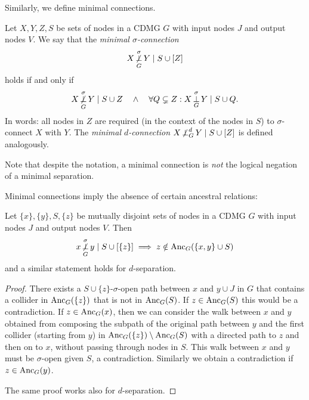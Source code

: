Similarly, we define minimal connections.
\begin{Def}\label{def:min_con}
Let $X,Y,Z,S$ be sets of nodes in a CDMG $G$ with input nodes $J$ and output nodes $V$. 
We say that the \emph{minimal $\sigma$-connection}
  $$X \operatorname*{\not\perp}_G^\sigma Y \mid S \cup [Z]$$
holds if and only if
  $$X \operatorname*{\not\perp}_G^\sigma Y \mid S \cup Z\quad\land\quad \forall Q \subsetneq Z: X \operatorname*{\perp}_G^\sigma Y \mid S \cup Q.$$
In words: all nodes in $Z$ are required (in the context of the nodes in $S$) to $\sigma$-connect $X$ with $Y$.
The \emph{minimal $d$-connection} $X \operatorname*{\not\perp}_G^d Y \mid S \cup [Z]$ is defined analogously.
\end{Def}
Note that despite the notation, a minimal connection is \emph{not} the logical negation of a minimal separation.

Minimal connections imply the absence of certain ancestral relations:
\begin{Prp}\label{prp:min_con}
Let $\{x\},\{y\},S,\{z\}$ be mutually disjoint sets of nodes in a CDMG $G$ with input nodes $J$ and output nodes $V$. Then
$$x \operatorname*{\not\perp}_G^\sigma y \mid S \cup [\{z\}] \implies z \notin \mathrm{Anc}_{G}(\{x, y\} \cup S)$$
and a similar statement holds for $d$-separation.
\end{Prp}
\begin{proof}
There exists a $S \cup \{z\}$-$\sigma$-open path between $x$ and $y \cup J$ in $G$ that contains a collider in $\mathrm{Anc}_{G}(\{z\})$ that is not in $\mathrm{Anc}_{G}(S)$. 
If $z \in \mathrm{Anc}_{G}(S)$ this would be a contradiction.
If $z \in \mathrm{Anc}_{G}(x)$, then we can consider the walk between $x$ and $y$ obtained from composing the subpath of the original path between $y$ and the first collider (starting from $y$) in $\mathrm{Anc}_{G}(\{z\}) \setminus \mathrm{Anc}_{G}(S)$ with a directed path to $z$ and then on to $x$, without passing through nodes in $S$.
This walk between $x$ and $y$ must be $\sigma$-open given $S$, a contradiction.
Similarly we obtain a contradiction if $z \in \mathrm{Anc}_{G}(y)$.

The same proof works also for $d$-separation.
\end{proof}
